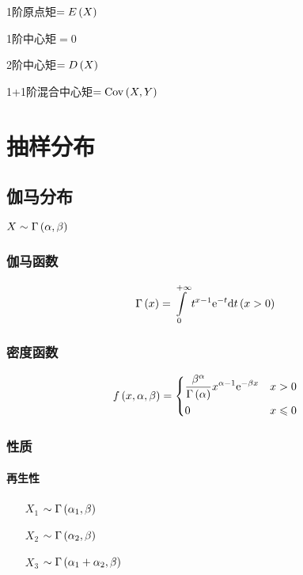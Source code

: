\documentclass{article}
\begin{document}
1阶原点矩$=E\left(X\right)$

1阶中心矩$=0$

2阶中心矩$=D\left(X\right)$

1+1阶混合中心矩$=\mathrm{Cov}\left(X,Y\right)$

\section{抽样分布}

\subsection{伽马分布}

$X\sim\Gamma\left(\alpha,\beta\right)$

\subsubsection{伽马函数}

\[\Gamma\left(x\right)=\int\limits_0^{+\infty}t^{x-1}\mathrm e^{-t}\mathrm d t\left(x>0\right)\]

\subsubsection{密度函数}

\[f\left(x,\alpha,\beta\right)=
    \left\{\begin{aligned}
         & \frac{\beta^\alpha}{\Gamma\left(\alpha\right)}x^{\alpha-1}\mathrm e^{-\beta x} &  & x>0         \\
         & 0                                                              &  & x\leqslant0
    \end{aligned}\right.\]

\subsubsection{性质}

\paragraph{再生性}

\begin{enumerate}
    \item [$X_1$] $\sim\Gamma\left(\alpha_1,\beta\right)$
    \item [$X_2$] $\sim\Gamma\left(\alpha_2,\beta\right)$
    \item [$X_3$] $\sim\Gamma\left(\alpha_1+\alpha_2,\beta\right)$
\end{enumerate}
\end{document}
